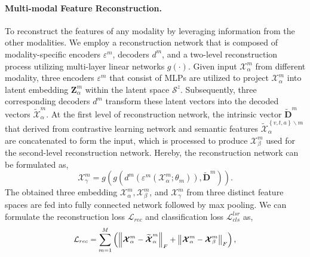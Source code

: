 \paragraph{Multi-modal Feature Reconstruction.} To reconstruct the features of any modality by leveraging information from the other modalities. We employ a reconstruction network that is composed of modality-specific encoders $ \varepsilon^m$, decoders $d^m$, and a two-level reconstruction process utilizing multi-layer linear networks $g(\cdot)$. Given input $\bm{\mathcal X}_{\alpha}^{m}$ from different modality, three encoders $\varepsilon ^m$ that consist of MLPs are utilized to project $\bm{\bm{\mathcal{X}}}_{\alpha }^{m}$ into latent embedding $\bm{Z}_{\alpha }^{m}$ within the latent space $\mathcal{S}^z$. Subsequently, three corresponding decoders $d^m$ transform these latent vectors into the decoded vectors $\bm{\mathcal{\widetilde{X}}}_{\alpha }^{m}$. 
At the first level of reconstruction network, the intrinsic vector $\bm{\widetilde{D}}^{m}$ that derived from contrastive learning network and semantic features $\mathcal{\widetilde{X}}_{\alpha }^{\left\{v,t,a \right\}\backslash m}$ are concatenated to form the input, which is processed to produce $\bm{\mathcal{X}}_{\beta }^{m}$ used for the second-level reconstruction network. Hereby, the reconstruction network can be formulated as,
\begin{equation}
    \bm{\bm{\mathcal{X}}}_{\gamma }^{m}=g\left ( g\left ( d^m(\varepsilon^m(\bm{\mathcal X}_{\alpha}^{m};\theta_{m}) ), \bm{\widetilde{D}}^{m} \right ) \right ).
\end{equation}
The obtained three embedding $\bm{\mathcal{X}}_{\alpha }^{m},\bm{\mathcal{X}}_{\beta }^{m}$, and $\bm{\mathcal{X}}_{\gamma }^{m}$ from three distinct feature spaces are fed into fully connected network followed by max pooling.
We can formulate the reconstruction loss $\mathcal{L}_{rec}$ and classification loss $\mathcal{L}_{cls}^{lsr}$ as,
\begin{equation}
\small
\label{L_rec}
\mathcal{L}_{rec} = \sum_{m=1}^{M} \left( \left\|\bm{\mathcal{X}}_{\alpha}^{m} - \widetilde{\bm{\mathcal{X}}}_{\alpha}^{m} \right\|_{F} + \left\|\bm{\mathcal{X}}_{\alpha}^{m} - \bm{\mathcal{X}}_{\beta}^{m} \right\|_{F} \right),
\end{equation}

